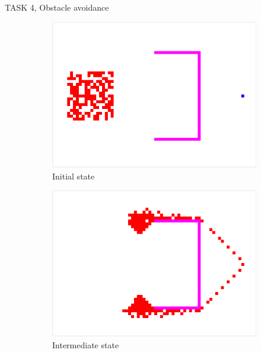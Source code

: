 \documentclass[10pt,a4paper]{article}
\begin{document}
\begin{task}{TASK 4, Obstacle avoidance}
\begin{figure}[htbp]
  \centering
  \begin{subfigure}[b]{0.31\textwidth}
    \includegraphics[width=\textwidth]{pictures/Task4_initial_cd.png}
    \caption{Initial state}
    \label{fig:Task4_initial_cd}
  \end{subfigure}
  \begin{subfigure}[b]{0.31\textwidth}
    \includegraphics[width=\textwidth]{pictures/Task4_intermediate_cd.png}
    \caption{Intermediate state}
    \label{fig:Task4_intermediate_cd}
  \end{subfigure}
  \begin{subfigure}[b]{0.31\textwidth}

\end{subfigure}
\end{figure}
\end{task}
\end{document}
